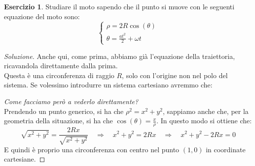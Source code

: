 \documentclass[11pt,a4paper,twoside]{article}
\theoremstyle{definition}
\newtheorem{ese}{Esercizio}[section]
\newenvironment{sol}
	{\renewcommand\qedsymbol{$\blacksquare$}\begin{proof}[Soluzione]}
	{\end{proof}}
\begin{document}
\begin{ese}
	Studiare il moto sapendo che il punto si muove con le seguenti equazione del moto sono:
	\[\begin{cases} \rho = 2R\cos (\theta)\\ \theta = \frac{at^2}{2} + \omega t \end{cases}\]
\end{ese}

\begin{sol}
	Anche qui, come prima, abbiamo già l'equazione della traiettoria, ricavandola direttamente dalla prima.\\
	Questa è una circonferenza di raggio $R$, solo con l'origine non nel polo del sistema. Se volessimo introdurre un sistema cartesiano avremmo che:
	\begin{center}
	\end{center}
	\textit{Come facciamo però a vederlo direttamente?}\\
	Prendendo un punto generico, si ha che $\rho^2 = x^2 + y^2$, sappiamo anche che, per la geometria della situazione, si ha che $\cos(\theta) = \frac x \rho$. In questo modo si ottiene che:
	\[ \sqrt{x^2 + y^2} = \frac{2 Rx}{\sqrt{x^2 + y^2}} \quad \Rightarrow \quad x^2 + y^2 =2Rx \quad \Rightarrow \quad x^2 + y^2 - 2Rx = 0 \]
	E quindi è proprio una circonferenza con centro nel punto $(1,0)$ in coordinate cartesiane.


\end{sol}
\end{document}
